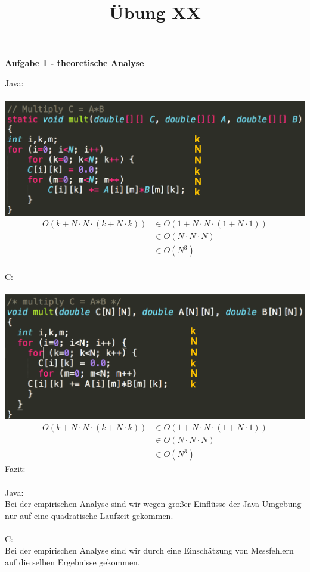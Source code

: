 \documentclass[a4paper,11pt]{scrartcl}
\title{Übung XX}
\begin{document}
\begin{center}
\LARGE{\textbf{Aufgabe 1 - theoretische Analyse}}
\end{center}
Java:\\\\
\includegraphics[width=.7\textwidth]{java.png}\\
\begin{align*}
	O(k + N\cdot N\cdot(k + N\cdot k))&\in O(1 + N\cdot N\cdot(1 + N\cdot 1))\\
	&\in O(N\cdot N\cdot N)\\
	&\in O(N^3)
\end{align*}
\\
C:\\\\
\includegraphics[width=.7\textwidth]{c.png}\\
\begin{align*}
O(k + N\cdot N\cdot(k + N\cdot k))&\in O(1 + N\cdot N\cdot(1 + N\cdot 1))\\
&\in O(N\cdot N\cdot N)\\
&\in O(N^3)
\end{align*}
Fazit:\\\\
Java:\\
Bei der empirischen Analyse sind wir wegen großer Einflüsse der Java-Umgebung nur auf eine quadratische Laufzeit gekommen.\\\\
C:\\
Bei der empirischen Analyse sind wir durch eine Einschätzung von Messfehlern auf die selben Ergebnisse gekommen.
\end{document}
